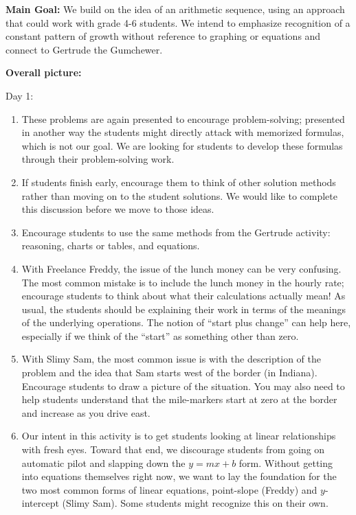 \documentclass[nooutcomes, noauthor, handout]{ximera}
\begin{document}
\pagebreak
\begin{instructorNotes}


{\bf Main Goal:} We build on the idea of an arithmetic sequence, using an approach that could work with grade 4-6 students.  We intend to emphasize  recognition of a constant pattern of growth without reference to graphing or equations and connect to Gertrude the Gumchewer.


{\bf Overall picture:}

Day 1:

\begin{enumerate}
\item These problems are again presented to encourage problem-solving; presented in another way the students might directly attack with memorized formulas, which is not our goal. We are looking for students to develop these formulas through their problem-solving work.
\item If students finish early, encourage them to think of other solution methods rather than moving on to the student solutions. We would like to complete this discussion before we move to those ideas.
\item Encourage students to use the same methods from the Gertrude activity: reasoning, charts or tables, and equations.
\item With Freelance Freddy, the issue of the lunch money can be very confusing. The most common mistake is to include the lunch money in the hourly rate; encourage students to think about what their calculations actually mean! As usual, the students should be explaining their work in terms of the meanings of the underlying operations. The notion of ``start plus change'' can help here, especially if we think of the ``start'' as something other than zero.
\item With Slimy Sam, the most common issue is with the description of the problem and the idea that Sam starts west of the border (in Indiana). Encourage students to draw a picture of the situation. You may also need to help students understand that the mile-markers start at zero at the border and increase as you drive east.
\item Our intent in this activity is to get students looking at linear relationships with fresh eyes.  Toward that end, we discourage students from going on automatic pilot and slapping down the $y = mx + b$ form.  Without getting into equations themselves right now, we want to lay the foundation for the two most common forms of linear equations, point-slope (Freddy) and $y$-intercept (Slimy Sam).  Some students might recognize this on their own.
\end{enumerate}



\end{instructorNotes}
\end{document}

